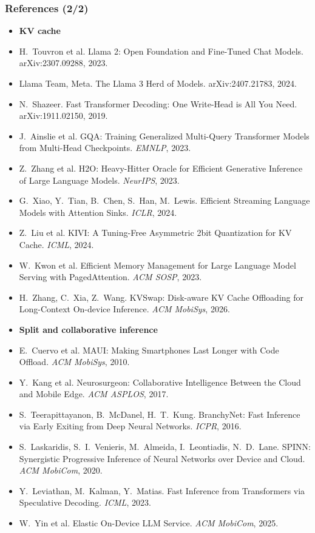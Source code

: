 \begin{frame}
\frametitle{References (2/2)}
\tiny
\begin{itemize}\setlength{\itemsep}{1pt}
\item[] \textbf{KV cache}
\item H.~Touvron et al. Llama 2: Open Foundation and Fine-Tuned Chat Models. arXiv:2307.09288, 2023.
\item Llama Team, Meta. The Llama 3 Herd of Models. arXiv:2407.21783, 2024.
\item N.~Shazeer. Fast Transformer Decoding: One Write-Head is All You Need. arXiv:1911.02150, 2019.
\item J.~Ainslie et al. GQA: Training Generalized Multi-Query Transformer Models from Multi-Head Checkpoints. \emph{EMNLP}, 2023.
\item Z.~Zhang et al. H2O: Heavy-Hitter Oracle for Efficient Generative Inference of Large Language Models. \emph{NeurIPS}, 2023.
\item G.~Xiao, Y.~Tian, B.~Chen, S.~Han, M.~Lewis. Efficient Streaming Language Models with Attention Sinks. \emph{ICLR}, 2024.
\item Z.~Liu et al. KIVI: A Tuning-Free Asymmetric 2bit Quantization for KV Cache. \emph{ICML}, 2024.
\item W.~Kwon et al. Efficient Memory Management for Large Language Model Serving with PagedAttention. \emph{ACM SOSP}, 2023.
\item H.~Zhang, C.~Xia, Z.~Wang. KVSwap: Disk-aware KV Cache Offloading for Long-Context On-device Inference. \emph{ACM MobiSys}, 2026.
\item[] \textbf{Split and collaborative inference}
\item E.~Cuervo et al. MAUI: Making Smartphones Last Longer with Code Offload. \emph{ACM MobiSys}, 2010.
\item Y.~Kang et al. Neurosurgeon: Collaborative Intelligence Between the Cloud and Mobile Edge. \emph{ACM ASPLOS}, 2017.
\item S.~Teerapittayanon, B.~McDanel, H.~T.~Kung. BranchyNet: Fast Inference via Early Exiting from Deep Neural Networks. \emph{ICPR}, 2016.
\item S.~Laskaridis, S.~I.~Venieris, M.~Almeida, I.~Leontiadis, N.~D.~Lane. SPINN: Synergistic Progressive Inference of Neural Networks over Device and Cloud. \emph{ACM MobiCom}, 2020.
\item Y.~Leviathan, M.~Kalman, Y.~Matias. Fast Inference from Transformers via Speculative Decoding. \emph{ICML}, 2023.
\item W.~Yin et al. Elastic On-Device LLM Service. \emph{ACM MobiCom}, 2025.

\end{itemize}
\end{frame}
